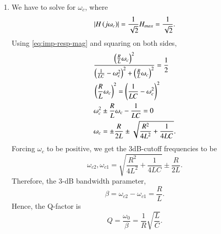 \documentclass[journal,12pt,twocolumn]{IEEEtran}
\begin{document}
\begin{enumerate}[label=\theenumi.]
    \item We have to solve for \(\omega_c\), where
    \begin{equation}
        \left\vert H\left(j\omega_c\right)\right\vert = \frac{1}{\sqrt{2}}H_{max} = \frac{1}{\sqrt{2}}.
        \label{eq:h-wc}
    \end{equation}
    Using \eqref{eq:imp-resp-mag} and squaring on both sides,
    \begin{align}
        &\frac{\left(\frac{R}{L}\omega_c\right)^2}{\left(\frac{1}{LC}-\omega_c^2\right)^2 + \left(\frac{R}{L}\omega_c\right)^2} = \frac{1}{2} \\
        &\left(\frac{R}{L}\omega_c\right)^2 = \left(\frac{1}{LC} - \omega_c^2\right)^2 \\
        &\omega_c^2 \pm \frac{R}{L}\omega_c - \frac{1}{LC} = 0 \\
        &\omega_c = \pm \frac{R}{2L} \pm \sqrt{\frac{R^2}{4L^2} + \frac{1}{4LC}}.
    \end{align}
    Forcing \(\omega_c\) to be positive, we get the 3dB-cutoff frequencies to be
    \begin{equation}
        \omega_{c2}, \omega_{c1} = \sqrt{\frac{R^2}{4L^2} + \frac{1}{4LC}} \pm \frac{R}{2L}.
        \label{eq:omega-cutoff}
    \end{equation}
    Therefore, the 3-dB bandwidth parameter,
    \begin{equation}
        \beta = \omega_{c2} - \omega_{c1} = \frac{R}{L}.
        \label{eq:3db-bandwidth}
    \end{equation}
    Hence, the Q-factor is
    \begin{equation}
        Q = \frac{\omega_0}{\beta} = \frac{1}{R}\sqrt{\frac{L}{C}}.
        \label{eq:q-factor}
    \end{equation}


\end{enumerate}
\end{document}
